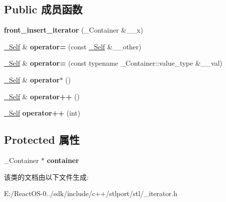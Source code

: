 \subsection*{Public 成员函数}
\begin{DoxyCompactItemize}
\item 
\mbox{\label{classfront__insert__iterator_a0f31fba4936c366920e9bc1f386f4c2d}} 
{\bfseries front\+\_\+insert\+\_\+iterator} (\+\_\+\+Container \&\+\_\+\+\_\+x)
\item 
\mbox{\label{classfront__insert__iterator_ad45d791318c628765928498315036d68}} 
\hyperlink{classfront__insert__iterator}{\+\_\+\+Self} \& {\bfseries operator=} (const \hyperlink{classfront__insert__iterator}{\+\_\+\+Self} \&\+\_\+\+\_\+other)
\item 
\mbox{\label{classfront__insert__iterator_a45e03efec4680cb51fba01b8737b34de}} 
\hyperlink{classfront__insert__iterator}{\+\_\+\+Self} \& {\bfseries operator=} (const typename \+\_\+\+Container\+::value\+\_\+type \&\+\_\+\+\_\+val)
\item 
\mbox{\label{classfront__insert__iterator_a62d492788e93427fc67e4704a23e6f44}} 
\hyperlink{classfront__insert__iterator}{\+\_\+\+Self} \& {\bfseries operator$\ast$} ()
\item 
\mbox{\label{classfront__insert__iterator_a33c0b0a766597bb390f68d8550033443}} 
\hyperlink{classfront__insert__iterator}{\+\_\+\+Self} \& {\bfseries operator++} ()
\item 
\mbox{\label{classfront__insert__iterator_a3165c367870c89ecb211eacd36d36936}} 
\hyperlink{classfront__insert__iterator}{\+\_\+\+Self} {\bfseries operator++} (int)
\end{DoxyCompactItemize}
\subsection*{Protected 属性}
\begin{DoxyCompactItemize}
\item 
\mbox{\label{classfront__insert__iterator_a4a628b5af651d45d2238afca4b90edb7}} 
\+\_\+\+Container $\ast$ {\bfseries container}
\end{DoxyCompactItemize}


该类的文档由以下文件生成\+:\begin{DoxyCompactItemize}
\item 
E\+:/\+React\+O\+S-\/0../sdk/include/c++/stlport/stl/\+\_\+iterator.\+h\end{DoxyCompactItemize}
